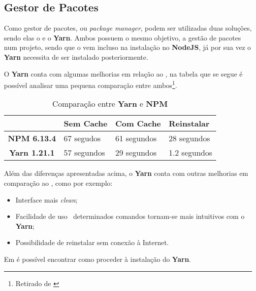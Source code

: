\subsection{Gestor de Pacotes}

Como gestor de pacotes, ou \textit{package manager}, podem ser utilizadas duas soluções, sendo elas o \textbf{} e o \textbf{Yarn}. Ambos possuem o mesmo objetivo, a gestão de pacotes num projeto, sendo que o \textbf{} vem incluso na instalação no \textbf{NodeJS}, já por sua vez o \textbf{Yarn} necessita de ser instalado posteriormente.

O \textbf{Yarn} conta com algumas melhorias em relação ao \textbf{}, na tabela que se segue é possível analisar uma pequena comparação entre ambos\footnote{Retirado de \cite{yarnVSNpm}}.

\begin{table}[h!]
	\renewcommand{\arraystretch}{1.25}
	\centering
	\begin{tabularx}{.85\textwidth}{ |c X X X| }
		\rowcolor{estg} & {\color[HTML]{FFFFFF} \textbf{Sem Cache}} & 	{\color[HTML]{FFFFFF} \textbf{Com Cache}} & {\color[HTML]{FFFFFF} \textbf{Reinstalar}} \\\hline


		\textbf{NPM 6.13.4} & 67 segudos & 61 segundos & 28 segundos \\\hline
		\textbf{Yarn 1.21.1} & 57 segundos & 29 segundos & 1.2 segundos \\\hline
	\end{tabularx}

	\caption{Comparação entre \textbf{Yarn} e \textbf{NPM}}
\end{table}

Além das diferenças apresentadas acima, o \textbf{Yarn} conta com outras melhorias em comparação ao \textbf{}, como por exemplo:

\begin{itemize}
	\item Interface mais \textit{clean};
	\item Facilidade de uso \textemdash ~determinados comandos tornam-se mais intuitivos com o \textbf{Yarn};
	\item Possibilidade de reinstalar  sem conexão à Internet.
\end{itemize}


Em  é possível encontrar como proceder à instalação do \textbf{Yarn}.